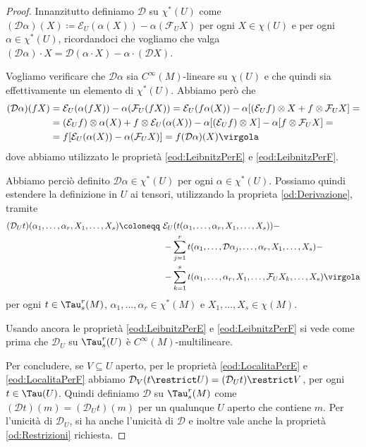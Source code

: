 \begin{proof} %
	Innanzitutto definiamo $\mathcal D$ su $\chi^*(U)$ come $(\mathcal D\alpha) (X) \coloneqq \mathcal E_U(\alpha(X)) - \alpha( \mathcal F_UX)$ per ogni $X\in\chi(U)$ e per ogni $\alpha \in \chi^*(U)$, ricordandoci che vogliamo che valga $(\mathcal D\alpha)\cdot X = \mathcal D(\alpha\cdot X) - \alpha\cdot(\mathcal D X)$. 
	
	Vogliamo verificare che $\mathcal D\alpha$ sia $C^\infty(M)$-lineare su $\chi(U)$ e che quindi sia effettivamente un elemento di $\chi^*(U)$.
	Abbiamo però che
	\begin{align*}
		(\mathcal D\alpha)(fX) &= \mathcal E_U(\alpha(fX)) - \alpha(\mathcal F_U(fX))= \mathcal E_U(f\alpha (X)) - \alpha [(\mathcal E_Uf)\otimes X + f \otimes \mathcal F_UX] = \\
		&= (\mathcal E_U f)\otimes \alpha (X) + f \otimes \mathcal E_U (\alpha (X)) - \alpha [(\mathcal E_U f) \otimes X] - \alpha [f \otimes \mathcal F_U X] = \\
		&= f [\mathcal E_U (\alpha (X))- \alpha( \mathcal F_UX)] = f(\mathcal D\alpha) (X) \virgola
	\end{align*}
	dove abbiamo utilizzato le proprietà \ref{eod:LeibnitzPerE} e \ref{eod:LeibnitzPerF}.
	
	Abbiamo perciò definito $\mathcal D\alpha \in \chi^*(U)$ per ogni $\alpha\in\chi^*(U)$. Possiamo quindi estendere la definizione in $U$ ai tensori, utilizzando la proprieta \ref{od:Derivazione}, tramite 
	\begin{align*}
		(\mathcal D_U t) (\alpha_1,\ldots,\alpha_r,X_1,\ldots,X_s) \coloneqq\ & \mathcal E_U(t(\alpha_1,\ldots,\alpha_r,X_1,\ldots,X_s)) -\\
		&-\sum_{j=1}^rt(\alpha_1,\ldots, \mathcal D\alpha_j,\ldots,\alpha_r,X_1,\ldots,X_s) -\\
		&- \sum_{k=1}^s t(\alpha_1,\ldots,\alpha_r,X_1,\ldots,\mathcal F_UX_k,\ldots,X_s)\virgola
	\end{align*}
	per ogni $t\in\Tau_s^r(M)$, $\alpha_1,\ldots,\alpha_r\in\chi^*(M)$ e $X_1,\ldots,X_s\in\chi(M)$.
	
	Usando ancora le proprietà \ref{eod:LeibnitzPerE} e \ref{eod:LeibnitzPerF} si vede come prima che $\mathcal D_U$ su $\Tau_s^r(U)$ è $C^\infty(M)$-multilineare.

Per concludere, se $V\subseteq U$ aperto, per le proprietà \ref{eod:LocalitaPerE} e \ref{eod:LocalitaPerF} abbiamo $\mathcal D_V(t\restrict U) = (\mathcal D_U t)\restrict V$, per ogni $t\in\Tau(U)$.
Quindi definiamo $\mathcal D$ su $\Tau_s^r(M)$ come $(\mathcal D t) (m) = (\mathcal D_U t) (m)$ per un qualunque $U$ aperto che contiene $m$.
Per l'unicità di $\mathcal D_U$, si ha anche l'unicità di $\mathcal D$ e inoltre vale anche la proprietà \ref{od:Restrizioni} richiesta.
\end{proof}

